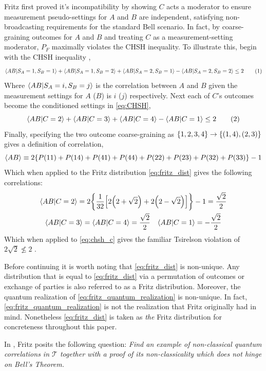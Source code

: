 \documentclass[aps, 10pt, english, twoside, pra, nofootinbib, longbibliography]{revtex4-1}
\theoremstyle{plain}
\theoremstyle{definition}
\theoremstyle{remark}
\newcommand{\ts}{\mathcal{T}}
\begin{document}
    Fritz first proved it's incompatibility \cite{Fritz_2012} by showing $C$ acts a moderator to ensure measurement pseudo-settings for $A$ and $B$ are independent, satisfying non-broadcasting requirements for the standard Bell scenario. In fact, by coarse-graining outcomes for $A$ and $B$ and treating $C$ as a measurement-setting moderator, $P_F$ maximally violates the CHSH inequality. To illustrate this, begin with the CHSH inequality \cite{CHSH_Original},
    \[ \ba{AB|S_A=1, S_B=1} + \ba{AB|S_A=1, S_B=2} + \ba{AB|S_A=2, S_B=1} - \ba{AB|S_A=2, S_B=2} \leq 2 \eq \label{eq:CHSH}\]
    Where $\ba{AB|S_A=i, S_B=j}$ is the correlation between $A$ and $B$ given the measurement settings for $A$ ($B$) is $i$ ($j$) respectively. Next each of $C$'s outcomes become the conditioned settings in \cref{eq:CHSH},
    \[ \ba{AB|C=2} + \ba{AB|C=3} + \ba{AB|C=4} - \ba{AB|C=1} \leq 2 \eq \label{eq:chsh_c}\]
    Finally, specifying the two outcome coarse-graining as $\bc{1,2,3,4} \rightarrow \bc{\br{1,4}, \br{2,3}}$ gives a definition of correlation,
    \[ \ba{AB} \defined 2\bc{\prob[][11] + \prob[][14] + \prob[][41] + \prob[][44] + \prob[][22] + \prob[][23] + \prob[][32] + \prob[][33]} - 1 \]
    Which when applied to the Fritz distribution \cref{eq:fritz_dist} gives the following correlations:
    \begin{gather*}
    \ba{AB|C=2} = 2 \bc{\f{1}{32}\bs{2\br{2+\sqrt{2}}+2\br{2-\sqrt{2}}}} - 1 = \f{\sqrt{2}}{2} \\
    \ba{AB|C=3} = \ba{AB|C=4} = \f{\sqrt{2}}{2} \quad \ba{AB|C=1} = -\f{\sqrt{2}}{2}
    \end{gather*}
    Which when applied to \cref{eq:chsh_c} gives the familiar Tsirelson violation of $2\sqrt{2} \not\leq 2$ \cite{Cirelson_1980}.

    Before continuing it is worth noting that \cref{eq:fritz_dist} is non-unique. Any distribution that is equal to \cref{eq:fritz_dist} via a permutation of outcomes or exchange of parties is also referred to as a Fritz distribution. Moreover, the quantum realization of \cref{eq:fritz_quantum_realization} is non-unique. In fact, \cref{eq:fritz_quantum_realization} is not the realization that Fritz originally had in mind. Nonetheless \cref{eq:fritz_dist} is taken as \textit{the} Fritz distribution for concreteness throughout this paper.

    In \cite{Fritz_2012}, Fritz posits the following question: \textit{Find an example of non-classical quantum correlations in $\ts$ together with a proof of its non-classicality which does not hinge on Bell’s Theorem.}
\end{document}
